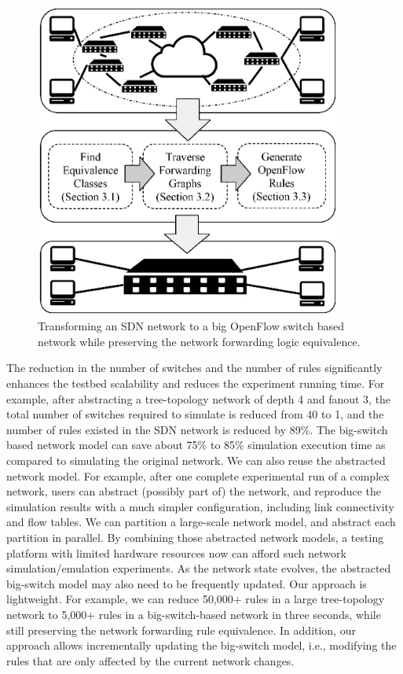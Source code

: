 \begin{figure}[t]
\centering
\includegraphics[width=0.9\textwidth]{OneBigSwitch/figures/BigSimOverview.eps}
\caption[One Big Switch Abstraction Overview]{Transforming an SDN network to a
    big OpenFlow switch based network while preserving the network forwarding logic equivalence.}
\label{OBS:Fig:BigSimOverview}
\end{figure}

The reduction in the number of switches and the number of rules significantly enhances the testbed scalability and reduces the experiment running time.
For example, after abstracting a tree-topology network of depth 4 and fanout 3,
the total number of switches required to simulate is reduced from 40 to 1, and the number of rules existed in the SDN network is reduced by 89\%.
The big-switch based network model can save about
75\% to 85\% simulation execution time as compared to simulating the original network.
We can also reuse the abstracted network model.
For example, after one complete experimental run of a complex network,
users can abstract (possibly part of) the network, and reproduce the simulation results with
a much simpler configuration, including link connectivity and flow tables.
We can partition a large-scale network model, and abstract each partition in parallel.
By combining those abstracted network models, a testing platform with limited hardware resources
now can afford such network simulation/emulation experiments.
As the network state evolves, the abstracted big-switch model may also need to be frequently updated.
Our approach is lightweight. For example, we can reduce 50,000+ rules in a large tree-topology network
to 5,000+ rules in a big-switch-based network in three seconds, 
while still preserving the network forwarding rule equivalence.
In addition, our approach allows incrementally updating the big-switch model,
i.e., modifying the rules that are only affected by the current network changes.

